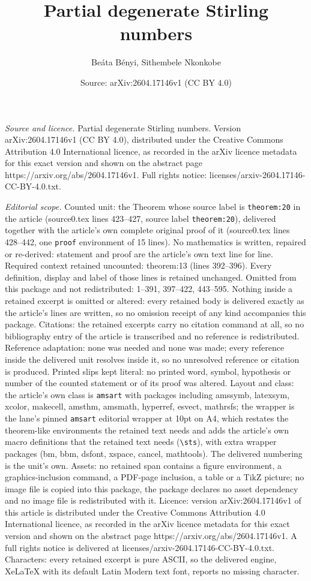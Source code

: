 \documentclass[10pt,a4paper]{amsart}
\title[Partial degenerate Stirling numbers]{Partial degenerate Stirling numbers}
\author{Be\'ata B\'enyi, Sithembele Nkonkobe}
\date{Source: arXiv:2604.17146v1 (CC BY 4.0)}
\begin{document}
\maketitle

\noindent\emph{Source and licence.} Partial degenerate Stirling numbers. Version arXiv:2604.17146v1 (CC BY 4.0), distributed under the Creative Commons Attribution 4.0 International licence, as recorded in the arXiv licence metadata for this exact version and shown on the abstract page https://arxiv.org/abs/2604.17146v1. Full rights notice: licenses/arxiv-2604.17146-CC-BY-4.0.txt.\par\smallskip

\noindent\textit{Editorial scope.} Counted unit: the Theorem whose source label is \texttt{theorem:20} in the article (source0.tex lines 423--427, source label \texttt{theorem:20}), delivered together with the article's own complete original proof of it (source0.tex lines 428--442, one \texttt{proof} environment of 15 lines). No mathematics is written, repaired or re-derived: statement and proof are the article's own text line for line. Required context retained uncounted: theorem:13 (lines 392--396). Every definition, display and label of those lines is retained unchanged. Omitted from this package and not redistributed: 1--391, 397--422, 443--595. Nothing inside a retained excerpt is omitted or altered: every retained body is delivered exactly as the article's lines are written, so no omission receipt of any kind accompanies this package. Citations: the retained excerpts carry no citation command at all, so no bibliography entry of the article is transcribed and no reference is redistributed. Reference adaptation: none was needed and none was made; every reference inside the delivered unit resolves inside it, so no unresolved reference or citation is produced. Printed slips kept literal: no printed word, symbol, hypothesis or number of the counted statement or of its proof was altered. Layout and class: the article's own class is \texttt{amsart} with packages including amssymb, latexsym, xcolor, makecell, amsthm, amsmath, hyperref, esvect, mathrsfs; the wrapper is the lane's pinned \texttt{amsart} editorial wrapper at 10pt on A4, which restates the theorem-like environments the retained text needs and adds the article's own macro definitions that the retained text needs (\texttt{\textbackslash sts}), with extra wrapper packages (bm, bbm, dsfont, xspace, cancel, mathtools). The delivered numbering is the unit's own. Assets: no retained span contains a figure environment, a graphics-inclusion command, a PDF-page inclusion, a table or a TikZ picture; no image file is copied into this package, the package declares no asset dependency and no image file is redistributed with it. Licence: version arXiv:2604.17146v1 of this article is distributed under the Creative Commons Attribution 4.0 International licence, as recorded in the arXiv licence metadata for this exact version and shown on the abstract page https://arxiv.org/abs/2604.17146v1. A full rights notice is delivered at licenses/arxiv-2604.17146-CC-BY-4.0.txt. Characters: every retained excerpt is pure ASCII, so the delivered engine, XeLaTeX with its default Latin Modern text font, reports no missing character.
\end{document}
